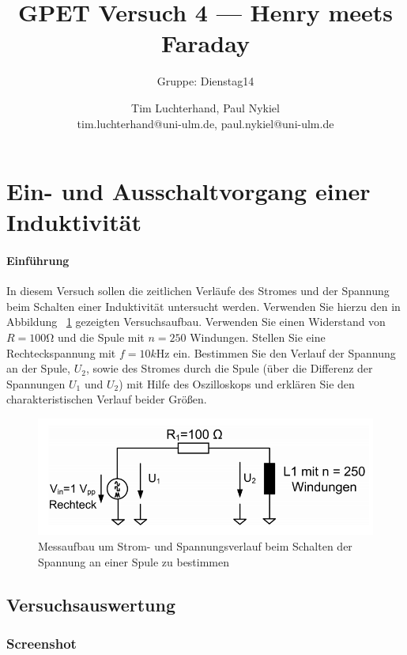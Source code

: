 \documentclass[10pt]{scrreprt}
\author{Tim Luchterhand, Paul Nykiel \protect\\ tim.luchterhand@uni-ulm.de, paul.nykiel@uni-ulm.de}
\title{GPET Versuch 4 --- Henry meets Faraday}
\subtitle{Gruppe: Dienstag14}
\begin{document}
        \maketitle
        \section{Ein- und Ausschaltvorgang einer Induktivität}
        \paragraph{Einführung}
        In diesem Versuch sollen die zeitlichen Verläufe des Stromes und der Spannung beim
        Schalten einer Induktivität untersucht werden. Verwenden Sie hierzu den in Abbildung
        ~\ref{fig:abb13} gezeigten Versuchsaufbau. Verwenden Sie einen Widerstand von $R=100\si{\ohm}$ und die
        Spule mit $n=250$ Windungen. Stellen Sie eine Rechteckspannung mit $f=10\si{k\hertz}$ ein.
        Bestimmen Sie den Verlauf der Spannung an der Spule, $U_2$, sowie des Stromes durch die
        Spule (über die Differenz der Spannungen $U_1$ und $U_2$) mit Hilfe des Oszilloskops und
        erklären Sie den charakteristischen Verlauf beider Größen.
        \begin{center}
            \begin{figure}[H]
                \includegraphics[width=\textwidth]{Abbildung13.png}
                \caption{Messaufbau um Strom- und Spannungsverlauf beim Schalten der Spannung
an einer Spule zu bestimmen}
                \label{fig:abb13}
            \end{figure}
        \end{center}

        \subsection{Versuchsauswertung}

        \subsubsection{Screenshot}
\end{document}
